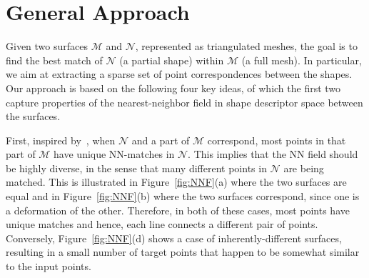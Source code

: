 \chapter{General Approach}
\label{sec:approach}


Given two surfaces $\mathcal{M}$ and $\mathcal{N}$, represented as triangulated meshes, the goal is to find the best match of  $\mathcal{N}$ (a partial shape) within  $\mathcal{M}$ (a full mesh).
In particular, we aim at extracting a sparse set of point correspondences between the shapes.
Our approach is based on the following four key ideas, of which the first two capture properties of the nearest-neighbor field in shape descriptor space between the surfaces.

First, inspired by~\cite{talmi2017template}, 
when $\mathcal{N}$ and a part of $\mathcal{M}$ correspond, most points in that part of $\mathcal{M}$ have unique NN-matches in $\mathcal{N}$.
This implies that the NN field should be highly diverse, in the sense that many different points in $\mathcal{N}$ are being matched.
This is illustrated in Figure~\ref{fig:NNF}(a) where the two surfaces are equal and in Figure~\ref{fig:NNF}(b) where the two surfaces correspond, since one is a deformation of the other.
Therefore, in both of these cases, most points have unique matches and hence,  each line connects a different pair of points.
Conversely, Figure~\ref{fig:NNF}(d) shows a case of inherently-different surfaces, resulting in  a small number of target points that happen to be somewhat similar to the input points.


